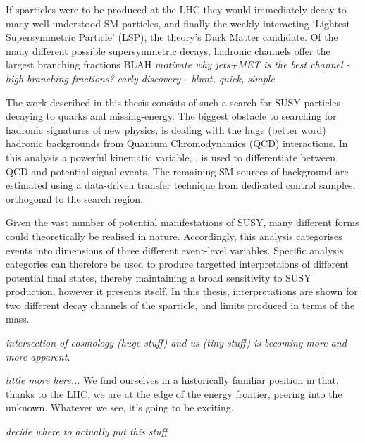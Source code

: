 If sparticles were to be produced at the LHC they would immediately decay to
many well-understood SM particles, and finally the weakly interacting `Lightest
Supersymmetric Particle' (LSP), the theory's Dark Matter candidate. Of the many
different possible supersymmetric decays, hadronic channels offer the largest
branching fractions BLAH
\emph{motivate why jets+MET is the best channel - high branching fractions?}
\emph{early discovery - blunt, quick, simple}

The work described in this thesis consists of such a search for SUSY particles
decaying to quarks and missing-energy. The biggest obstacle to
searching for hadronic signatures of new physics, is dealing with the huge
(better word) hadronic backgrounds from Quantum Chromodynamics (QCD)
interactions. In this
analysis a powerful kinematic variable, \alphat, is used to differentiate
between QCD and potential signal events. The remaining SM sources of background
are estimated using a data-driven transfer technique from dedicated control
samples, orthogonal to the search region.

Given the vast number of potential manifestations of SUSY, many different forms
could theoretically be realised in nature. Accordingly, this analysis
categorises events into dimensions of three different event-level variables.
Specific analysis categories can therefore be used to produce targetted
interpretaions of different potential final states, thereby maintaining a broad
sensitivity to SUSY production, however it presents itself. In this thesis,
interpretations are shown for two different decay channels of the \sTop
sparticle, and limits produced in terms of the \sTop mass.


\emph{intersection of cosmology (huge stuff) and us (tiny stuff) is becoming more
and
more apparent.}

\emph{little more here...}
We find ourselves in a historically familiar position in that, thanks to the
LHC, we are at the edge of the energy frontier, peering into the unknown.
Whatever we see, it's going to be exciting.




\emph{decide where to actually put this stuff}

